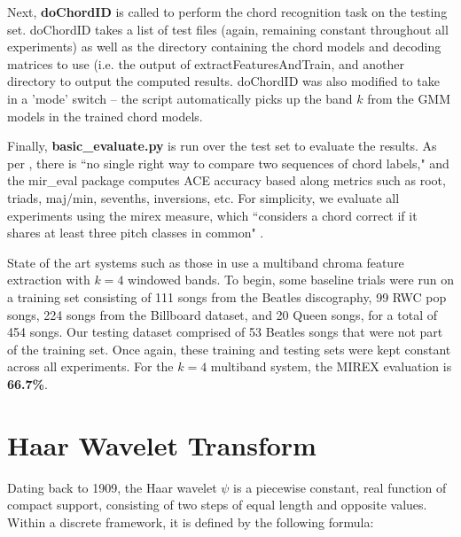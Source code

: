\documentclass{article}
\begin{document}
	Next, \textsf{\textbf{doChordID}} is called to perform the chord recognition task on the testing set. \textsf{doChordID} takes a list of test files (again, remaining constant throughout all experiments) as well as the directory containing the chord models and decoding matrices to use (i.e. the output of \textsf{extractFeaturesAndTrain}, and another directory to output the computed results. \textsf{doChordID} was also modified to take in a 'mode' switch -- the script automatically picks up the band $k$ from the GMM models in the trained chord models.
	
	Finally, \textsf{\textbf{basic\_evaluate.py}} is run over the test set to evaluate the results. As per \cite{raffel2014mir}, there is ``no single right way to compare two sequences of chord labels," and the \textsf{mir\_eval} package computes ACE accuracy based along metrics such as root, triads, maj/min, sevenths, inversions, etc. For simplicity, we evaluate all experiments using the \textsf{mirex} measure, which ``considers a chord correct if it shares at least three pitch classes in common" \cite{raffel2014mir}.
	
	State of the art systems such as those in \cite{cho2014on} use a multiband chroma feature extraction with $k=4$ windowed bands. To begin, some baseline trials were run on a training set consisting of 111 songs from the Beatles discography, 99 RWC pop songs, 224 songs from the Billboard dataset, and 20 Queen songs, for a total of 454 songs. Our testing dataset comprised of 53 Beatles songs that were not part of the training set. Once again, these training and testing sets were kept constant across all experiments. For the $k=4$ multiband system, the \textsf{MIREX} evaluation is \textbf{66.7\%}.
	

\section{Haar Wavelet Transform}\label{sec:haar}
Dating back to 1909, the Haar wavelet $\psi$ is a piecewise constant, real function of compact support, consisting of two steps of equal length and opposite values. Within a discrete framework, it is defined by the following formula:
\end{document}
